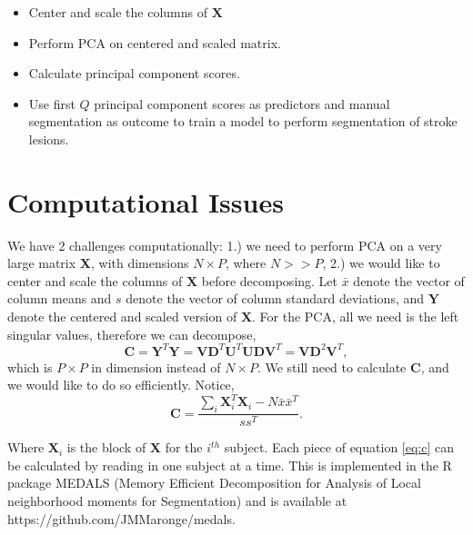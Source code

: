 \documentclass[a0,landscape]{a0poster}
\begin{document}
\begin{multicols}{3}
\begin{itemize}
\item  Center and scale the columns of $\mathbf{X}$
\item Perform PCA on centered and scaled matrix.
\item Calculate principal component scores. 
\item Use first $Q$ principal component scores as predictors and manual segmentation as outcome to train a model to perform segmentation of stroke lesions.
\end{itemize}
\large{\section*{\color{uwred}Computational Issues}}
\noindent We have 2 challenges computationally: 1.) we need to perform PCA on a very large matrix $\mathbf{X}$, with dimensions $N \times P$, where $N>>P$, 2.) we would like to center and scale the columns of $\mathbf{X}$ before decomposing. Let $\bar{x}$ denote the vector of column means and $s$ denote the vector of column standard deviations, and $\mathbf{Y}$ denote the centered and scaled version of $\mathbf{X}$. For the PCA, all we need is the left singular values, therefore we can decompose,
\begin{equation*}
\mathbf{C} = \mathbf{Y}^T\mathbf{Y} = \mathbf{V}\mathbf{D}^T\mathbf{U}^T\mathbf{U}\mathbf{D}\mathbf{V}^T = \mathbf{V}\mathbf{D}^2\mathbf{V}^T,
\end{equation*}
which is $P \times P$ in dimension instead of $N \times P$. We still need to calculate $\mathbf{C}$, and we would like to do so efficiently. Notice,
\begin{equation} \label{eq:c}
\mathbf{C} = \frac{\sum_i\mathbf{X}_i^T\mathbf{X}_i-N\bar{x}\bar{x}^T}{ss^T}.
\end{equation}

\noindent Where $\mathbf{X}_i$ is the block of $\mathbf{X}$ for the $i^{th}$ subject. Each piece of equation \ref{eq:c} can be calculated by reading in one subject at a time. This is implemented in the R package MEDALS (Memory Efficient Decomposition for Analysis of Local neighborhood moments for Segmentation) and is available at https://github.com/JMMaronge/medals.
\vspace{.5cm}




\end{multicols}
\end{document}
